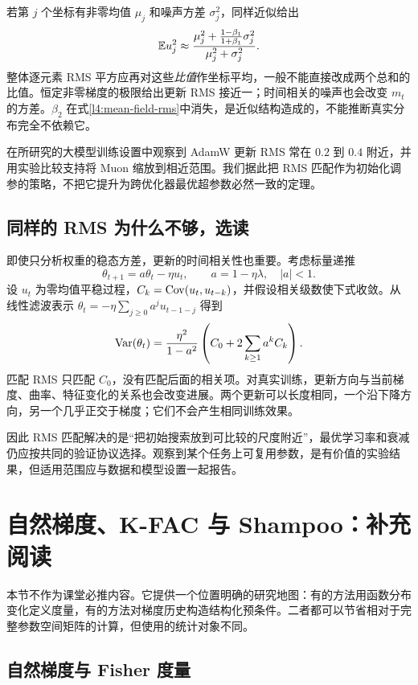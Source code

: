 若第 $j$ 个坐标有非零均值 $\mu_j$ 和噪声方差 $\sigma_j^2$，同样近似给出
\[
 \mathbb E u_j^2\approx
 \frac{\mu_j^2+\frac{1-\beta_1}{1+\beta_1}\sigma_j^2}
 {\mu_j^2+\sigma_j^2}.
\]
整体逐元素 RMS 平方应再对这些\emph{比值}作坐标平均，一般不能直接改成两个总和的比值。恒定非零梯度的极限给出更新 RMS 接近一；时间相关的噪声也会改变 $m_t$ 的方差。$\beta_2$ 在式\eqref{l4:mean-field-rms}中消失，是近似结构造成的，不能推断真实分布完全不依赖它。

\citet{Liu2025}在所研究的大模型训练设置中观察到 AdamW 更新 RMS 常在 $0.2$ 到 $0.4$ 附近，并用实验比较支持将 Muon 缩放到相近范围。我们据此把 RMS 匹配作为初始化调参的策略，不把它提升为跨优化器最优超参数必然一致的定理。

\subsection{同样的 RMS 为什么不够，选读}

即使只分析权重的稳态方差，更新的时间相关性也重要。考虑标量递推
\[
 \theta_{t+1}=a\theta_t-\eta u_t,
 \qquad a=1-\eta\lambda,\quad |a|<1.
\]
设 $u_t$ 为零均值平稳过程，$C_k=\operatorname{Cov}(u_t,u_{t-k})$，并假设相关级数使下式收敛。从线性滤波表示
$\theta_t=-\eta\sum_{j\geq0}a^ju_{t-1-j}$ 得到
\begin{equation}
 \operatorname{Var}(\theta_t)=\frac{\eta^2}{1-a^2}
 \left(C_0+2\sum_{k\geq1}a^kC_k\right).
 \label{l4:correlated-update-variance}
\end{equation}
匹配 RMS 只匹配 $C_0$，没有匹配后面的相关项。对真实训练，更新方向与当前梯度、曲率、特征变化的关系也会改变进展。两个更新可以长度相同，一个沿下降方向，另一个几乎正交于梯度；它们不会产生相同训练效果。

因此 RMS 匹配解决的是“把初始搜索放到可比较的尺度附近”，最优学习率和衰减仍应按共同的验证协议选择。观察到某个任务上可复用参数，是有价值的实验结果，但适用范围应与数据和模型设置一起报告。

\section{自然梯度、K-FAC 与 Shampoo：补充阅读}
\label{l4:second-order-optional}

本节不作为课堂必推内容。它提供一个位置明确的研究地图：有的方法用函数分布变化定义度量，有的方法对梯度历史构造结构化预条件。二者都可以节省相对于完整参数空间矩阵的计算，但使用的统计对象不同。

\subsection{自然梯度与 Fisher 度量}

